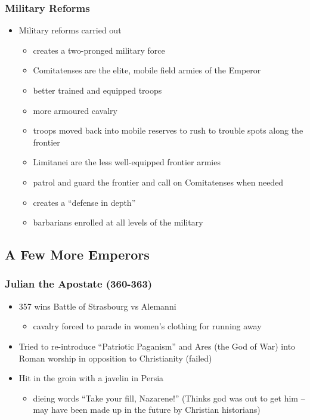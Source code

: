 \documentclass[12pt, twoside]{article}
\begin{document}
\subsubsection{Military Reforms}
\begin{itemize}
\item Military reforms carried out
	\begin{itemize}
	\item creates a two-pronged military force
	\item Comitatenses are the elite, mobile field armies of the Emperor
	\item better trained and equipped troops
	\item more armoured cavalry
	\item troops moved back into mobile reserves to rush to trouble spots along the frontier
	\item Limitanei are the less well-equipped frontier armies
	\item patrol and guard the frontier and call on Comitatenses when needed
	\item creates a “defense in depth”
	\item barbarians enrolled at all levels of the military
	\end{itemize}
\end{itemize}

\subsection{A Few More Emperors}
\subsubsection{Julian the Apostate (360-363)}
\begin{itemize}
\item 357 wins Battle of Strasbourg vs Alemanni
	\begin{itemize}
	\item cavalry forced to parade in women’s clothing for running away
	\end{itemize}
\item Tried to re-introduce “Patriotic Paganism” and Ares (the God of War) into Roman worship in opposition to Christianity (failed)
\item Hit in the groin with a javelin in Persia
	\begin{itemize}
	\item dieing words “Take your fill, Nazarene!” (Thinks god was out to get him – may have been made up in the future by Christian historians)
	\end{itemize}
\end{itemize}
\end{document}
